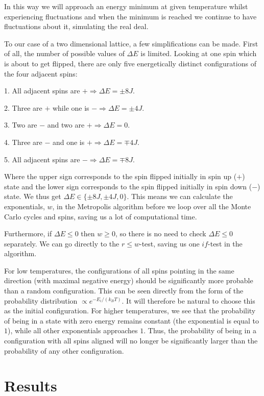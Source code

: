 \documentclass[english, 12pt]{article}
\begin{document}
In this way we will approach an energy minimum at given temperature whilst experiencing fluctuations and when the minimum is reached we continue to have fluctuations about it, simulating the real deal.

To our case of a two dimensional lattice, a few simplifications can be made. First of all, the number of possible values of $\Delta E$ is limited. Looking at one spin which is about to get flipped, there are only five energetically distinct configurations of the four adjacent spins:

1. All adjacent spins are $+ \Rightarrow \Delta E = \pm8J$. 

2. Three are $+$ while one is $- \Rightarrow \Delta E = \pm 4J$. 

3. Two are $-$ and two are $+ \Rightarrow \Delta E = 0$. 

4. Three are $-$ and one is $+ \Rightarrow \Delta E = \mp 4J$. 

5. All adjacent spins are $- \Rightarrow \Delta E = \mp 8J$.

Where the upper sign corresponds to the spin flipped initially in spin up ($+$) state and the lower sign corresponds to the spin flipped initially in spin down ($-$) state.
We thus get  $\Delta E\in\{\pm8J, \pm4J, 0\}$. This means we can calculate the exponentials, $w$, in the Metropolis algorithm before we loop over all the Monte Carlo cycles and spins, saving us a lot of computational time.

Furthermore, if $\Delta E\leq 0$ then $w\geq0$, so there is no need to check $\Delta E\leq0$ separately. We can go directly to the $r\leq w$-test, saving us one $if$-test in the algorithm.

For low temperatures, the configurations of all spins pointing in the same direction (with maximal negative energy) should be significantly more probable than a random configuration. This can be seen directly from the form of the probability distribution $\propto e^{-E_i/(k_BT)}$. It will therefore be natural to choose this as the initial configuration. For higher temperatures, we see that the probability of being in a state with zero energy remains constant (the exponential is equal to $1$), while all other exponentials approaches $1$. Thus, the probability of being in a configuration with all spins aligned will no longer be significantly larger than the probability of any other configuration.

\section{Results}
\end{document}

